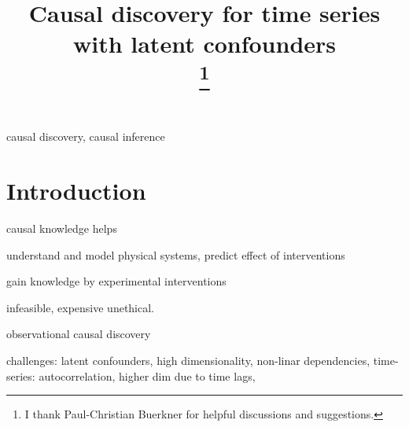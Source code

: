 \documentclass[conference]{IEEEtran}
\begin{document}
\title{Causal discovery for time series with latent confounders\\
\thanks{I thank Paul-Christian Buerkner for helpful discussions and
suggestions.}
}

\author{






}

\maketitle

\begin{abstract}

\end{abstract}

\begin{IEEEkeywords}
causal discovery, causal inference
\end{IEEEkeywords}

\section{Introduction}
causal knowledge helps 

understand and model physical systems, predict effect of interventions

gain knowledge by experimental interventions 

infeasible, expensive unethical. 

observational causal discovery

challenges:
latent confounders, high dimensionality, non-linar dependencies, 
time-series: autocorrelation, higher dim due to time lags, 
\end{document}
